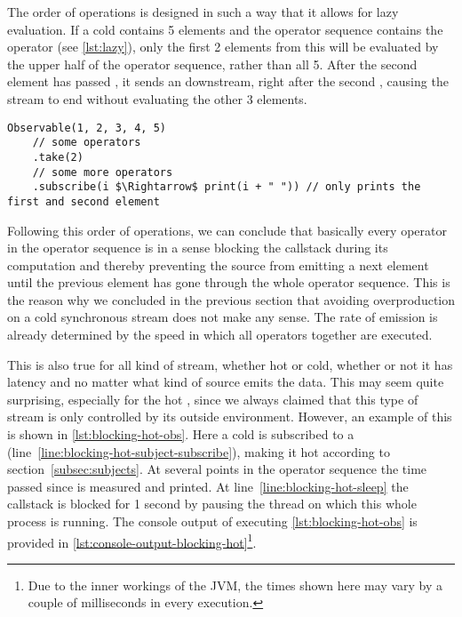 The order of operations is designed in such a way that it allows for lazy evaluation. If a cold \obs contains 5 elements and the operator sequence contains the operator  (see \autoref{lst:lazy}), only the first 2 elements from this \obs will be evaluated by the upper half of the operator sequence, rather than all 5. After the second element has passed , it sends an  downstream, right after the second , causing the stream to end without evaluating the other 3 elements.

\begin{minipage}{\linewidth}
\begin{lstlisting}[style=ScalaStyle, caption={Lazy evaluation}, label={lst:lazy}]
Observable(1, 2, 3, 4, 5)
    // some operators
    .take(2)
    // some more operators
    .subscribe(i $\Rightarrow$ print(i + " ")) // only prints the first and second element
\end{lstlisting}
\end{minipage}

Following this order of operations, we can conclude that basically every operator in the operator sequence is in a sense blocking the callstack during its computation and thereby preventing the source from emitting a next element until the previous element has gone through the whole operator sequence. This is the reason why we concluded in the previous section that avoiding overproduction on a cold synchronous stream does not make any sense. The rate of emission is already determined by the speed in which all operators together are executed.

This is also true for all kind of stream, whether hot or cold, whether or not it has latency and no matter what kind of source emits the data. This may seem quite surprising, especially for the hot \obs, since we always claimed that this type of stream is only controlled by its outside environment. However, an example of this is shown in \autoref{lst:blocking-hot-obs}. Here a cold \obs is subscribed to a \subj (line~\ref{line:blocking-hot-subject-subscribe}), making it hot according to section~\ref{subsec:subjects}. At several points in the operator sequence the time passed since  is measured and printed. At line~\ref{line:blocking-hot-sleep} the callstack is blocked for 1 second by pausing the thread on which this whole process is running. The console output of executing \autoref{lst:blocking-hot-obs} is provided in \autoref{lst:console-output-blocking-hot}\footnote{Due to the inner workings of the JVM, the times shown here may vary by a couple of milliseconds in every execution.}.

